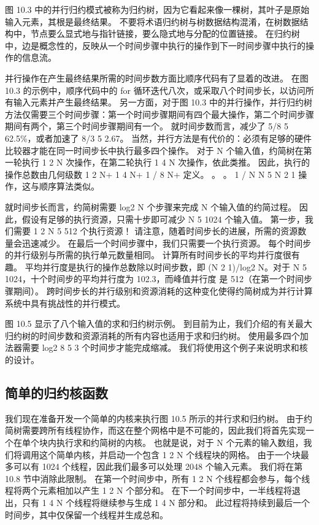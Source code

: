 图 10.3 中的并行归约模式被称为归约树，因为它看起来像一棵树，其叶子是原始输入元素，其根是最终结果。 不要将术语归约树与树数据结构混淆，在树数据结构中，节点要么显式地与指针链接，要么隐式地与分配的位置链接。 在归约树中，边是概念性的，反映从一个时间步骤中执行的操作到下一时间步骤中执行的操作的信息流。

并行操作在产生最终结果所需的时间步数方面比顺序代码有了显着的改进。 在图 10.3 的示例中，顺序代码中的 for 循环迭代八次，或采取八个时间步长，以访问所有输入元素并产生最终结果。 另一方面，对于图 10.3 中的并行操作，并行归约树方法仅需要三个时间步骤：第一个时间步骤期间有四个最大操作，第二个时间步骤期间有两个，第三个时间步骤期间有一个。 就时间步数而言，减少了 5/8 5 62.5\%，或者加速了 8/3 5 2.67。 当然，并行方法是有代价的：必须有足够的硬件比较器才能在同一时间步长中执行最多四个操作。 对于 N 个输入值，约简树在第一轮执行 1 2 N 次操作，在第二轮执行 1 4 N 次操作，依此类推。 因此，执行的操作总数由几何级数 1 2 N+ 1 4 N+ 1 / 8 N+ 定义。 。 。 1 / N N 5 N 2 1 操作，这与顺序算法类似。

就时间步长而言，约简树需要 log2 N 个步骤来完成 N 个输入值的约简过程。 因此，假设有足够的执行资源，只需十步即可减少 N 5 1024 个输入值。 第一步，我们需要 1 2 N 5 512 个执行资源！ 请注意，随着时间步长的进展，所需的资源数量会迅速减少。 在最后一个时间步骤中，我们只需要一个执行资源。 每个时间步的并行级别与所需的执行单元数量相同。 计算所有时间步长的平均并行度很有趣。 平均并行度是执行的操作总数除以时间步数，即 (N 2 1)/log2 N。对于 N 5 1024，十个时间步的平均并行度为 102.3，而峰值并行度 是 512（在第一个时间步骤期间）。 跨时间步长的并行级别和资源消耗的这种变化使得约简树成为并行计算系统中具有挑战性的并行模式。

图 10.5 显示了八个输入值的求和归约树示例。 到目前为止，我们介绍的有关最大归约树的时间步数和资源消耗的所有内容也适用于求和归约树。 使用最多四个加法器需要 log2 8 5 3 个时间步才能完成缩减。 我们将使用这个例子来说明求和核的设计。

\subsection{简单的归约核函数}
我们现在准备开发一个简单的内核来执行图 10.5 所示的并行求和归约树。 由于约简树需要跨所有线程协作，而这在整个网格中是不可能的，因此我们将首先实现一个在单个块内执行求和约简树的内核。 也就是说，对于 N 个元素的输入数组，我们将调用这个简单内核，并启动一个包含 1 2 N 个线程块的网格。 由于一个块最多可以有 1024 个线程，因此我们最多可以处理 2048 个输入元素。 我们将在第 10.8 节中消除此限制。 在第一个时间步中，所有 1 2 N 个线程都会参与，每个线程将两个元素相加以产生 1 2 N 个部分和。 在下一个时间步中，一半线程将退出，只有 1 4 N 个线程将继续参与生成 1 4 N 部分和。 此过程将持续到最后一个时间步，其中仅保留一个线程并生成总和。

